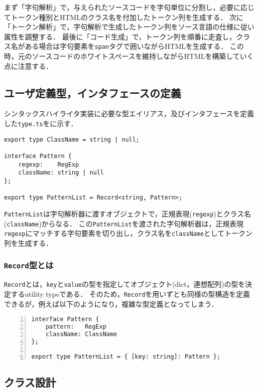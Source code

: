 \documentclass[autodetect-engine,dvi=dvipdfmx,ja=standard,
               a4j,11pt]{bxjsarticle}
\newcommand{\figref}[1]{\makebox{図~\ref{#1}}}
\begin{document}
まず「字句解析」で，与えられたソースコードを字句単位に分割し，必要に応じてトークン種別とHTMLのクラス名を付加したトークン列を生成する．
次に「トークン解析」で，字句解析で生成したトークン列をソース言語の仕様に従い属性を調整する．
最後に「コード生成」で，トークン列を順番に走査し，クラス名がある場合は字句要素を\verb|span|タグで囲いながらHTMLを生成する．
この時，元のソースコードのホワイトスペースを維持しながらHTMLを構築していく点に注意する．

\subsection{ユーザ定義型，インタフェースの定義}

シンタックスハイライタ実装に必要な型エイリアス，及びインタフェースを定義した\verb|type.ts|を\figref{prog:type}に示す．

\begin{lstlisting}[caption={インタフェースの定義({\tt type.ts})}, label={prog:type}]
export type ClassName = string | null;

interface Pattern {
    regexp:    RegExp
    className: string | null
};

export type PatternList = Record<string, Pattern>;
\end{lstlisting}

\verb|PatternList|は字句解析器に渡すオブジェクトで，正規表現(\verb|regexp|)とクラス名(\verb|className|)からなる．
この\verb|PatternList|を渡された字句解析器は，正規表現\verb|regexp|にマッチする字句要素を切り出し，クラス名を\verb|className|としてトークン列を生成する．

\subsubsection{{\tt Record}型とは}

\verb|Record|とは，\verb|key|と\verb|value|の型を指定してオブジェクト(dict，連想配列)の型を決定するutility typeである．
そのため，\verb|Record|を用いずとも同様の型構造を定義できるが，例えば以下のようになり，複雑な型定義となってしまう．

\begin{Verbatim}[numbers=left, xleftmargin=8mm, numbersep=6pt, fontsize=\small, baselinestretch=0.8]
interface Pattern {
    pattern:   RegExp
    className: ClassName
};

export type PatternList = { [key: string]: Pattern };
\end{Verbatim}

\subsection{クラス設計}
\end{document}
